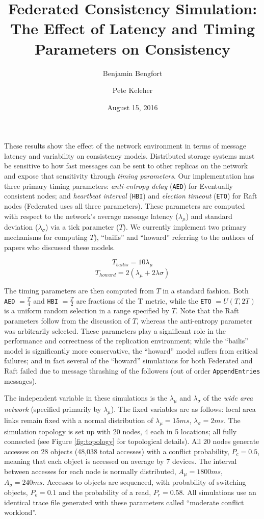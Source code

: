 \documentclass[11pt,letterpaper]{article}
\title{Federated Consistency Simulation: \\
 The Effect of Latency and Timing Parameters on Consistency}
\date{August 15, 2016}
\author[ ]{Benjamin Bengfort}
\author[ ]{Pete Keleher}
\affil[ ]{Department of Computer Science}
\affil[ ]{University of Maryland}
\affil[ ]{\textit{\{bengfort,keleher\}@cs.umd.edu}}
\begin{document}
\maketitle

These results show the effect of the network environment in terms of message latency and variability on consistency models. Distributed storage systems must be sensitive to how fast messages can be sent to other replicas on the network and expose that sensitivity through \textit{timing parameters}. Our implementation has three primary timing parameters: \textit{anti-entropy delay} (\texttt{AED}) for Eventually consistent nodes; and \textit{heartbeat interval} (\texttt{HBI}) and \textit{election timeout} (\texttt{ETO}) for Raft nodes (Federated uses all three parameters). These parameters are computed with respect to the network's average message latency ($\lambda_{\mu}$) and standard deviation ($\lambda_{\sigma}$) via a tick parameter ($T$). We currently implement two primary mechanisms for computing $T$), ``bailis'' and ``howard'' referring to the authors of papers who discussed these models.

\begin{equation}T_{bailis} = 10\lambda_{\mu}\end{equation}
\begin{equation}T_{howard} = 2(\lambda_{\mu} + 2\lambda{\sigma})\end{equation}

The timing parameters are then computed from $T$ in a standard fashion. Both \texttt{AED} $=\frac{T}{4}$ and \texttt{HBI} $=\frac{T}{2}$ are fractions of the T metric, while the \texttt{ETO} $=U(T, 2T)$ is a uniform random selection in a range specified by $T$. Note that the Raft parameters follow from the discussion of $T$, whereas the anti-entropy parameter was arbitrarily selected. These parameters play a significant role in the performance and correctness of the replication environment; while the ``bailis'' model is significantly more conservative, the ``howard'' model suffers from critical failures; and in fact several of the ``howard'' simulations for both Federated and Raft failed due to message thrashing of the followers (out of order \texttt{AppendEntries} messages).

The independent variable in these simulations is the $\lambda_{\mu}$ and $\lambda_{\sigma}$ of the \textit{wide area network} (specified primarily by $\lambda_{\mu}$). The fixed variables are as follows: local area links remain fixed with a normal distribution of $\lambda_{\mu} = 15ms$, $\lambda_{\sigma} = 2ms$. The simulation topology is set up with 20 nodes, 4 each in 5 locations; all fully connected (see Figure \ref{fig:topology} for topological details). All 20 nodes generate accesses on 28 objects (48,038 total accesses) with a conflict probability, $P_c = 0.5$, meaning that each object is accessed on average by 7 devices. The interval between accesses for each node is normally distributed, $A_{\mu}=1800ms$, $A_{\sigma}=240ms$. Accesses to objects are sequenced, with probability of switching objects, $P_o=0.1$ and the probability of a read, $P_r=0.58$. All simulations use an identical trace file generated with these parameters called ``moderate conflict workload''.
\end{document}
